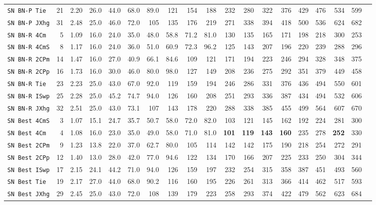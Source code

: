 \begin{tabular}{l | r @{~~} r | r@{~~}r@{~~}r@{~~}r@{~~}r@{~~}r@{~~}r@{~~}r@{~~}r@{~~}r@{~~}r@{~~}r@{~~}r@{~~}r@{~~}r@{~~}r|}
\verb+SN BN-P Tie + & 21 & 2.20 & 26.0&44.0&68.0&89.0&121&154&188&232&280&322&376&429&476&534&599\\
\verb+SN BN-P JXhg+ & 31 & 2.48 & 25.0&46.0&72.0&105&135&176&219&271&338&394&418&500&536&624&682\smallskip \\
\verb+SN BN-R 4Cm + & 5 & 1.09 & 16.0&24.0&35.0&48.0&58.8&71.2&81.0&130&135&165&171&198&218&300&253\\
\verb+SN BN-R 4CmS+ & 8 & 1.17 & 16.0&24.0&36.0&51.0&60.9&72.3&96.2&125&143&207&196&220&239&288&296\\
\verb+SN BN-R 2CPm+ & 14 & 1.47 & 16.0&27.0&40.9&66.1&84.6&109&121&171&194&223&246&294&328&348&375\\
\verb+SN BN-R 2CPp+ & 16 & 1.73 & 16.0&30.0&46.0&80.0&98.0&127&149&208&236&275&292&351&379&449&458\\
\verb+SN BN-R Tie + & 23 & 2.23 & 25.0&43.0&67.0&92.0&119&159&194&246&286&331&376&436&494&550&601\\
\verb+SN BN-R ISwp+ & 25 & 2.28 & 25.0&45.2&74.7&94.0&126&160&208&251&293&336&387&434&494&532&606\\
\verb+SN BN-R JXhg+ & 32 & 2.51 & 25.0&43.0&73.1&107&143&178&220&288&338&385&455&499&564&607&670\smallskip \\
\verb+SN Best 4CmS+ & 3 & 1.07 & 15.1&24.7&35.7&50.7&58.0&72.0&82.0&103&121&145&162&192&224&281&300\\
\verb+SN Best 4Cm + & 4 & 1.08 & 16.0&23.0&35.0&49.0&58.0&71.0&81.0&\textbf{101}&\textbf{119}&\textbf{143}&\textbf{160}&235&278&\textbf{252}&330\\
\verb+SN Best 2CPm+ & 9 & 1.23 & 13.8&22.0&37.0&62.7&80.0&105&114&142&142&175&190&218&254&272&291\\
\verb+SN Best 2CPp+ & 12 & 1.40 & 13.0&28.0&42.0&77.0&94.6&122&134&170&166&207&225&233&250&304&344\\
\verb+SN Best ISwp+ & 17 & 2.15 & 24.1&44.2&71.0&94.0&126&159&197&232&254&315&358&387&451&493&560\\
\verb+SN Best Tie + & 19 & 2.17 & 27.0&44.0&68.0&90.2&116&160&195&226&261&313&366&414&462&517&593\\
\verb+SN Best JXhg+ & 29 & 2.45 & 25.0&43.0&72.0&108&139&179&223&258&293&374&422&479&562&623&684\\
\end{tabular}
